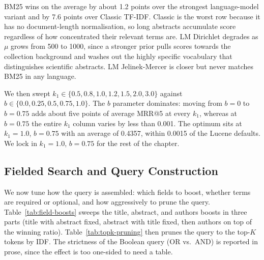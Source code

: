 BM25 wins on the average by about 1.2 points over the strongest language-model variant and by 7.6 points over Classic TF-IDF\@. Classic is the worst row because it has no document-length normalisation, so long abstracts accumulate score regardless of how concentrated their relevant terms are. LM Dirichlet degrades as $\mu$ grows from 500 to 1000, since a stronger prior pulls scores towards the collection background and washes out the highly specific vocabulary that distinguishes scientific abstracts. LM Jelinek-Mercer is closer but never matches BM25 in any language.

We then swept $k_1 \in \{0.5, 0.8, 1.0, 1.2, 1.5, 2.0, 3.0\}$ against $b \in \{0.0, 0.25, 0.5, 0.75, 1.0\}$. The $b$ parameter dominates: moving from $b{=}0$ to $b{=}0.75$ adds about five points of average MRR@5 at every $k_1$, whereas at $b{=}0.75$ the entire $k_1$ column varies by less than 0.001. The optimum sits at $k_1{=}1.0$, $b{=}0.75$ with an average of 0.4357, within 0.0015 of the Lucene defaults. We lock in $k_1{=}1.0$, $b{=}0.75$ for the rest of the chapter.

\subsection{Fielded Search and Query Construction}
\label{subsec:res-fielded}

We now tune how the query is assembled: which fields to boost, whether terms are required or optional, and how aggressively to prune the query. Table~\ref{tab:field-boosts} sweeps the title, abstract, and authors boosts in three parts (title with abstract fixed, abstract with title fixed, then authors on top of the winning ratio). Table~\ref{tab:topk-pruning} then prunes the query to the top-$K$ tokens by IDF\@. The strictness of the Boolean query (OR vs.\ AND) is reported in prose, since the effect is too one-sided to need a table.

